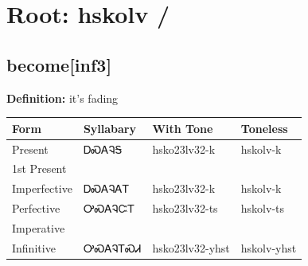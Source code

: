 \documentclass{article}%
\begin{document}
%
\normalsize%
\section*{Root: hskolv / }%
\subsection*{become[inf3]}%
\textbf{Definition: }%
it’s fading%
\\[0.5em]%
\begin{tabular}{|l|l|l|l|}%
\hline%
\textbf{Form}&\textbf{Syllabary}&\textbf{With Tone}&\textbf{Toneless}\\%
\hline%
Present&ᎠᏍᎪᎸᎦ&hsko23lv32{-}k&hskolv{-}k\\%
1st Present&&&\\%
Imperfective&ᎠᏍᎪᎸᎪᎢ&hsko23lv32{-}k&hskolv{-}k\\%
Perfective&ᎤᏍᎪᎸᏨᎢ&hsko23lv32{-}ts&hskolv{-}ts\\%
Imperative&&&\\%
Infinitive&ᎤᏍᎪᎸᎢᏍᏗ&hsko23lv32{-}yhst&hskolv{-}yhst\\%
\hline%
\end{tabular}%
\\[1em]%
\end{document}
